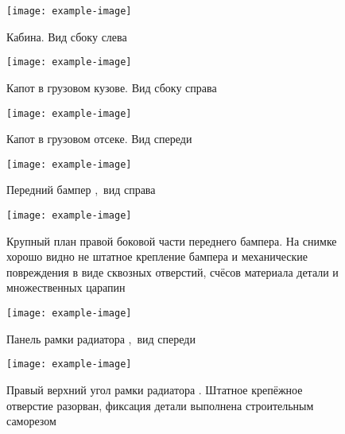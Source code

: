 {   \begin{figure}[H]
   	\centering
   	\texttt{[image: example-image]}
   	\caption{{\footnotesize {Кабина. Вид сбоку слева}}}
   	\label{слева}
   \end{figure}
   
   
   
    
   
      \begin{figure}[H]
   	\centering
   	\texttt{[image: example-image]}
   	\caption{{\footnotesize {Капот в грузовом кузове. Вид сбоку справа}}}
   	\label{капот1}
   \end{figure}
   
   
   
   
   
   
       \begin{figure}[H]
   	\centering
   	\texttt{[image: example-image]}
   	\caption{{\footnotesize {Капот в грузовом отсеке. Вид спереди}}}
   	\label{капот2}
   \end{figure}
   
   
   
   
   
   \begin{figure}[H]\centering
   	\parbox[t]{0.49\textwidth}
   	{\centering
   		\texttt{[image: example-image]}
   		\caption{\footnotesize {Передний бампер ,\, вид справа }}
   		\label{бампер}}
   	\hfil \hfil
   	\parbox[t]{0.49\textwidth}
   	{\centering
   		\texttt{[image: example-image]}
   		\caption{\footnotesize {Крупный план правой боковой части переднего бампера. На снимке хорошо видно не штатное крепление бампера и механические повреждения в виде сквозных отверстий, счёсов материала детали и множественных царапин}}
   		\label{бампер1}}
   \end{figure}





\begin{figure}[H]\centering
	\parbox[t]{0.49\textwidth}
	{\centering
		\texttt{[image: example-image]}
		\caption{\footnotesize {Панель рамки радиатора ,\, вид спереди}}
		\label{рамкарадиатора}}
	\hfil \hfil
	\parbox[t]{0.49\textwidth}
	{\centering
		\texttt{[image: example-image]}
		\caption{\footnotesize {Правый верхний угол рамки радиатора \tc. Штатное крепёжное отверстие разорван, фиксация детали выполнена строительным саморезом}}
		\label{рамкарадиатора2}}
\end{figure}
   
}
